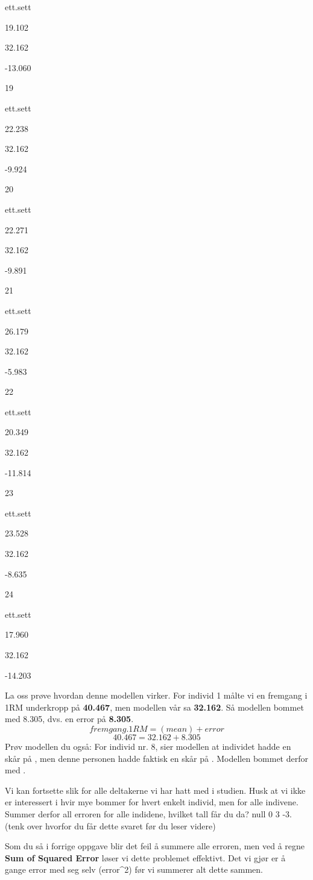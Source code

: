 \documentclass[
]{book}
\begin{document}
ett.sett

19.102

32.162

-13.060

19

ett.sett

22.238

32.162

-9.924

20

ett.sett

22.271

32.162

-9.891

21

ett.sett

26.179

32.162

-5.983

22

ett.sett

20.349

32.162

-11.814

23

ett.sett

23.528

32.162

-8.635

24

ett.sett

17.960

32.162

-14.203

La oss prøve hvordan denne modellen virker. For individ 1 målte vi en fremgang i 1RM underkropp på \textbf{40.467}, men modellen vår sa \textbf{32.162}. Så modellen bommet med 8.305, dvs. en error på \textbf{8.305}.
\[
fremgang.1RM = (mean) + error
\]
\[
40.467 = 32.162 + 8.305
\]
Prøv modellen du også: For individ nr. 8, sier modellen at individet hadde en skår på , men denne personen hadde faktisk en skår på . Modellen bommet derfor med .

Vi kan fortsette slik for alle deltakerne vi har hatt med i studien. Husk at vi ikke er interessert i hvir mye bommer for hvert enkelt individ, men for alle indivene. Summer derfor all erroren for alle indidene, hvilket tall får du da? null 0 3 -3. (tenk over hvorfor du får dette svaret før du leser videre)

Som du så i forrige oppgave blir det feil å summere alle erroren, men ved å regne \textbf{Sum of Squared Error} løser vi dette problemet effektivt. Det vi gjør er å gange error med seg selv (error\^{}2) før vi summerer alt dette sammen.
\end{document}
